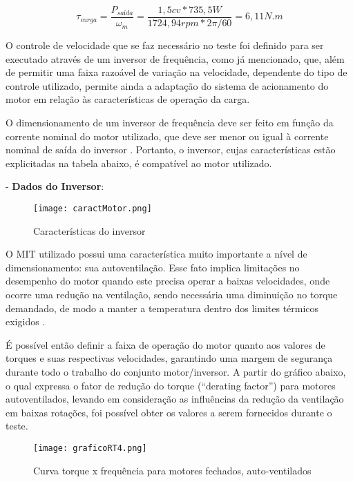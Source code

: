 	$$ \tau_{carga} = \frac{P_{saída}}{\omega_{m}} = \frac{1,5cv * 735,5W}{1724,94rpm * 2\pi/60} = 6,11 N.m $$

	O controle de velocidade que se faz necessário no teste foi definido para ser executado através de um inversor de frequência, como já mencionado, que, além de permitir uma faixa razoável de variação na velocidade, dependente do tipo de controle utilizado, permite ainda a adaptação do sistema de acionamento do motor em relação às características de operação da carga.
	
	O dimensionamento de um inversor de frequência deve ser feito em função da corrente nominal do motor utilizado, que deve ser menor ou igual à corrente nominal de saída do inversor \cite{WEGIF}. Portanto, o inversor, cujas características estão explicitadas na tabela abaixo, é compatível ao motor utilizado.

	- \textbf{Dados do Inversor}:

	\begin{figure}[!h]
		\centering
		\texttt{[image: caractMotor.png]}
		\caption[Características do inversor]{Características do inversor \cite{WEGIF}}
		\label{caractMotor}
	\end{figure}

	O MIT utilizado possui uma característica muito importante a nível de dimensionamento: sua autoventilação. Esse fato implica limitações no desempenho do motor quando este precisa operar a baixas velocidades, onde ocorre uma redução na ventilação, sendo necessária uma diminuição no torque demandado, de modo a manter a temperatura dentro dos limites térmicos exigidos \cite{WEGMotorEletrico}.

	É possível então definir a faixa de operação do motor quanto aos valores de torques e suas respectivas velocidades, garantindo uma margem de segurança durante todo o trabalho do conjunto motor/inversor. A partir do gráfico abaixo, o qual expressa o fator de redução do torque (“derating factor”) para motores autoventilados, levando em consideração as influências da redução da ventilação em baixas rotações, foi possível obter os valores a serem fornecidos durante o teste.

	\newpage
	\begin{figure}[!h]
		\centering
		\texttt{[image: graficoRT4.png]}
		\caption[Curva torque x frequência para motores fechados, auto-ventilados]{Curva torque x frequência para motores fechados, auto-ventilados \cite{WEGIF}}
		\label{graficoRT4}
	\end{figure}

